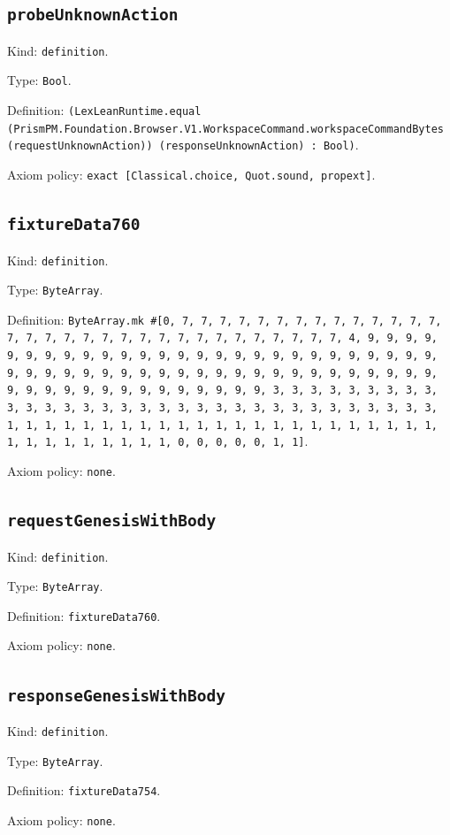 \documentclass[11pt]{article}
\begin{document}
\subsection*{\texttt{probeUnknownAction}}
\noindent Kind: \texttt{definition}.\par
\noindent Type: \texttt{Bool}.\par
\noindent Definition: \texttt{(LexLeanRuntime.equal (PrismPM.Foundation.Browser.V1.WorkspaceCommand.workspaceCommandBytes (requestUnknownAction)) (responseUnknownAction) : Bool)}.\par
\noindent Axiom policy: \texttt{exact [Classical.choice, Quot.sound, propext]}.\par
\subsection*{\texttt{fixtureData760}}
\noindent Kind: \texttt{definition}.\par
\noindent Type: \texttt{ByteArray}.\par
\noindent Definition: \texttt{ByteArray.mk \#[0, 7, 7, 7, 7, 7, 7, 7, 7, 7, 7, 7, 7, 7, 7, 7, 7, 7, 7, 7, 7, 7, 7, 7, 7, 7, 7, 7, 7, 7, 7, 7, 7, 4, 9, 9, 9, 9, 9, 9, 9, 9, 9, 9, 9, 9, 9, 9, 9, 9, 9, 9, 9, 9, 9, 9, 9, 9, 9, 9, 9, 9, 9, 9, 9, 9, 9, 9, 9, 9, 9, 9, 9, 9, 9, 9, 9, 9, 9, 9, 9, 9, 9, 9, 9, 9, 9, 9, 9, 9, 9, 9, 9, 9, 9, 9, 9, 9, 3, 3, 3, 3, 3, 3, 3, 3, 3, 3, 3, 3, 3, 3, 3, 3, 3, 3, 3, 3, 3, 3, 3, 3, 3, 3, 3, 3, 3, 3, 3, 3, 1, 1, 1, 1, 1, 1, 1, 1, 1, 1, 1, 1, 1, 1, 1, 1, 1, 1, 1, 1, 1, 1, 1, 1, 1, 1, 1, 1, 1, 1, 1, 1, 0, 0, 0, 0, 0, 1, 1]}.\par
\noindent Axiom policy: \texttt{none}.\par
\subsection*{\texttt{requestGenesisWithBody}}
\noindent Kind: \texttt{definition}.\par
\noindent Type: \texttt{ByteArray}.\par
\noindent Definition: \texttt{fixtureData760}.\par
\noindent Axiom policy: \texttt{none}.\par
\subsection*{\texttt{responseGenesisWithBody}}
\noindent Kind: \texttt{definition}.\par
\noindent Type: \texttt{ByteArray}.\par
\noindent Definition: \texttt{fixtureData754}.\par
\noindent Axiom policy: \texttt{none}.\par
\end{document}
